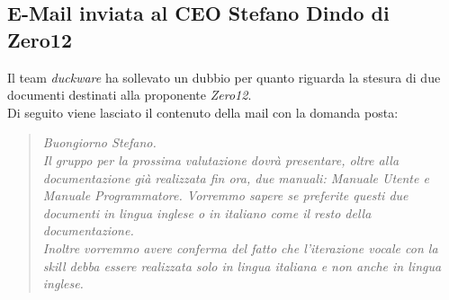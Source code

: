 	\subsection{E-Mail inviata al CEO Stefano Dindo di Zero12}
	\label{sec:mail_stefano}
	Il team \textit{duckware} ha sollevato un dubbio per quanto riguarda la stesura di due documenti destinati alla proponente \textit{Zero12}.\\
	Di seguito viene lasciato il contenuto della mail con la domanda posta:
	\begin{quote}
		\emph{Buongiorno Stefano.\\[0.25cm]Il gruppo per la prossima valutazione dovrà presentare, oltre alla documentazione già realizzata fin ora, due manuali: Manuale Utente e Manuale Programmatore. Vorremmo sapere se preferite questi due documenti in lingua inglese o in italiano come il resto della documentazione.\\[0.25cm]Inoltre vorremmo avere conferma del fatto che l'iterazione vocale con la skill debba essere realizzata solo in lingua italiana e non anche in lingua inglese.
		}
	\end{quote}
\pagebreak
